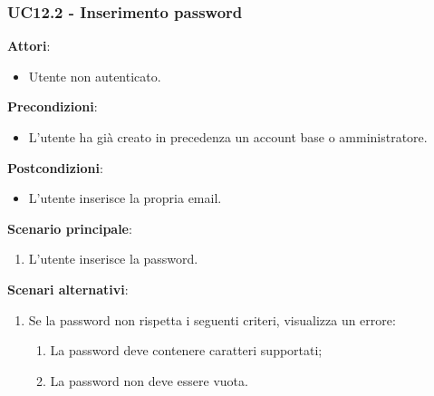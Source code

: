 \subsubsection{UC12.2 - Inserimento password} \label{usecase:12_2}
\textbf{Attori}:
\begin{itemize}
    \item Utente non autenticato.
\end{itemize}
\textbf{Precondizioni}:
\begin{itemize}
    \item L'utente ha già creato in precedenza un account base o amministratore.
\end{itemize}
\textbf{Postcondizioni}:
\begin{itemize}
    \item L'utente inserisce la propria email.
\end{itemize}
\textbf{Scenario principale}:
\begin{enumerate}
    \item L'utente inserisce la password.
\end{enumerate}
\textbf{Scenari alternativi}:
\begin{enumerate}
    \item Se la password non rispetta i seguenti criteri, visualizza un errore:
    \begin{enumerate}
        \item La password deve contenere caratteri supportati;
        \item La password non deve essere vuota.
    \end{enumerate}
\end{enumerate}